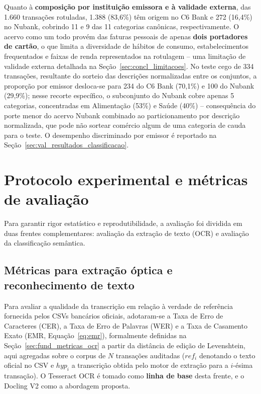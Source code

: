 Quanto à \textbf{composição por instituição emissora e à validade externa}, das 1.660 transações rotuladas, 1.388 (83,6\%) têm origem no C6 Bank e 272 (16,4\%) no Nubank, cobrindo 11 e 9 das 11 categorias canônicas, respectivamente. O acervo como um todo provém das faturas pessoais de apenas \textbf{dois portadores de cartão}, o que limita a diversidade de hábitos de consumo, estabelecimentos frequentados e faixas de renda representados na rotulagem -- uma limitação de validade externa detalhada na Seção~\ref{sec:concl_limitacoes}. No teste cego de 334 transações, resultante do sorteio das descrições normalizadas entre os conjuntos, a proporção por emissor desloca-se para 234 do C6 Bank (70,1\%) e 100 do Nubank (29,9\%); nesse recorte específico, o subconjunto do Nubank cobre apenas 5 categorias, concentradas em Alimentação (53\%) e Saúde (40\%) -- consequência do porte menor do acervo Nubank combinado ao particionamento por descrição normalizada, que pode não sortear comércio algum de uma categoria de cauda para o teste. O desempenho discriminado por emissor é reportado na Seção~\ref{sec:val_resultados_classificacao}.

\section{Protocolo experimental e métricas de avaliação}
\label{sec:val_protocolo}

Para garantir rigor estatístico e reprodutibilidade, a avaliação foi dividida em duas frentes complementares: avaliação da extração de texto (OCR) e avaliação da classificação semântica.

\subsection{Métricas para extração óptica e reconhecimento de texto}
Para avaliar a qualidade da transcrição em relação à verdade de referência fornecida pelos CSVs bancários oficiais, adotaram-se a Taxa de Erro de Caracteres (CER), a Taxa de Erro de Palavras (WER) e a Taxa de Casamento Exato (EMR, Equação~\ref{eq:emr}), formalmente definidas na Seção~\ref{sec:fund_metricas_ocr} a partir da distância de edição de Levenshtein, aqui agregadas sobre o corpus de $N$ transações auditadas ($ref_i$ denotando o texto oficial no CSV e $hyp_i$ a transcrição obtida pelo motor de extração para a $i$-ésima transação). O Tesseract OCR é tomado como \textbf{linha de base} desta frente, e o Docling V2 como a abordagem proposta.

